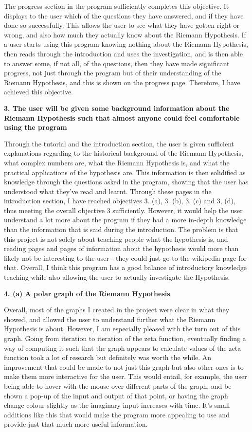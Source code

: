 \documentclass{article}
\begin{document}
The progress section in the program sufficiently completes this objective. It displays to the user which of the questions they have answered, and if they have done so successfully. This allows the user to see what they have gotten right or wrong, and also how much they actually know about the Riemann Hypothesis. If a user starts using this program knowing nothing about the Riemann Hypothesis, then reads through the introduction and uses the investigation, and is then able to answer some, if not all, of the questions, then they have made significant progress, not just through the program but of their understanding of the Riemann Hypothesis, and this is shown on the progress page. Therefore, I have achieved this objective.

\textbf{3. The user will be given some background information about the Riemann Hypothesis such that almost anyone could feel comfortable using the program}

Through the tutorial and the introduction section, the user is given sufficient explanations regarding to the historical background of the Riemann Hypothesis, what complex numbers are, what the Riemann Hypothesis is, and what the practical applications of the hypothesis are. This information is then solidified as knowledge through the questions asked in the program, showing that the user has understood what they've read and learnt. Through these pages in the introduction section, I have reached objectives 3. (a), 3. (b), 3. (c) and 3, (d), thus meeting the overall objective 3 sufficiently. However, it would help the user understand a lot more about the program if they had a more in-depth knowledge than the information that is said during the introduction. The problem is that this project is not solely about teaching people what the hypothesis is, and reading pages and pages of information about the hypothesis would more than likely not be interesting to the user - they could just go to the wikipedia page for that. Overall, I think this program has a good balance of introductory knowledge teaching while also allowing the user to actually investigate the Hypothesis.


\textbf{4. (a) A polar graph of the Riemann Hypothesis}

Overall, most of the graphs I created in the project were clear in what they showed, and allowed the user to understand further what the Riemann Hypothesis is about. However, I am especially pleased with the turn out of this graph. Going from iteration to iteration of the zeta function, eventually finding a way of computing it such that the graph appears to calculate values of the zeta function took a lot of research but definitely was worth the while. An improvement that could be made to not just this graph but also other ones is to make them more interactive for the user. This would entail, for example, the user being able to hover with the mouse over different parts of the graph, and be shown a pop-up of the input and output of that point, or having the graph change colour slightly as the imaginary input increases with time. It's small additions like this that would make the program more appealing to use and provide just that much more useful information.
\end{document}
